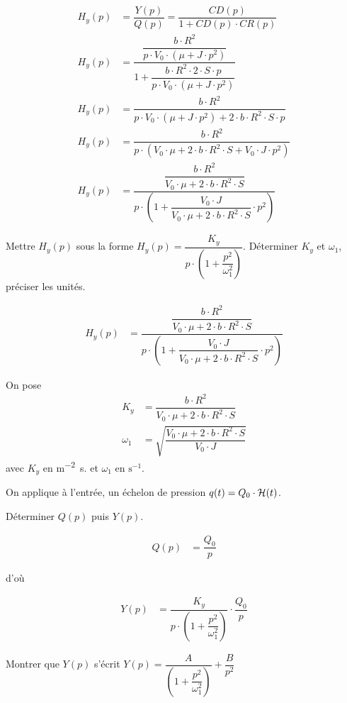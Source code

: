 \begin{Exo}[name={Devoir},title={Système de pendulation},origin={Adapté de Centrale MP 2000},label={exo:CentralePendulation}]
\begin{Cor}
\begin{multicols}{2}
\begin{align*}
H_y(p)&=\dfrac{Y(p)}{Q(p)}=\dfrac{CD(p)}{1+CD(p)\cdot CR(p)}\\
H_y(p)&=\dfrac{\dfrac{b\cdot R^2}{p\cdot V_0\cdot(\mu+J\cdot p^2)}}
{1+\dfrac{b\cdot R^2\cdot2\cdot S\cdot p}{p\cdot V_0\cdot(\mu+J\cdot p^2)}}\\
H_y(p)&=\dfrac{b\cdot R^2}
{{p\cdot V_0\cdot(\mu+J\cdot p^2)}+2\cdot b\cdot R^2\cdot S\cdot p}\\
H_y(p)&=\dfrac{b\cdot R^2}
{p\cdot \left( V_0\cdot\mu+2\cdot b\cdot R^2\cdot S+V_0\cdot J\cdot p^2\right)}\\
H_y(p)&=\dfrac{\dfrac{b\cdot R^2}{V_0\cdot\mu+2\cdot b\cdot R^2\cdot S}}
{p\cdot \left( 1+\dfrac{V_0\cdot J}{V_0\cdot\mu+2\cdot b\cdot R^2\cdot S}\cdot p^2\right)}
\end{align*}



\qst Mettre $H_y(p)$  sous la forme $H_y(p)=\dfrac{K_y}{p\cdot \left(1+\dfrac{p^2}{\omega_1^2}\right)}$. Déterminer $K_y$  et $\omega_1$, préciser les unités.

\begin{align*}
H_y(p)&=\dfrac{\dfrac{b\cdot R^2}{V_0\cdot\mu+2\cdot b\cdot R^2\cdot S}}
{p\cdot \left( 1+\dfrac{V_0\cdot J}{V_0\cdot\mu+2\cdot b\cdot R^2\cdot S}\cdot p^2\right)}
\end{align*}

On pose
\begin{align*}
K_y&=\dfrac{b\cdot R^2}{V_0\cdot\mu+2\cdot b\cdot R^2\cdot S}\\
\omega_1&=\sqrt{ \dfrac{V_0\cdot\mu+2\cdot b\cdot R^2\cdot S}{V_0\cdot J} }
\end{align*}
avec 
$K_y$  en \si{\metre\tothe{-2}\second}.
et 
$\omega_1$  en $\si{\second\tothe{-1}}$.



On applique à l'entrée, un échelon de pression $q(t)=Q_0\cdot \mathcal {H}(t)$.

\qst Déterminer $Q(p)$  puis $Y(p)$.

\begin{align*}
Q(p)&=\dfrac{Q_0}{p}
\end{align*}

d'où

\begin{align*}
Y(p)&=\dfrac{K_y}{p\cdot \left(1+\dfrac{p^2}{\omega_1^2}\right)}\cdot \dfrac{Q_0}{p}
\end{align*}


\qst Montrer que $Y(p)$  s'écrit $Y(p)=\dfrac{A}{ \left(1+\dfrac{p^2}{\omega_1^2}\right)} +\dfrac{B}{p^2}$



\end{multicols}
\end{Cor}
\end{Exo}
